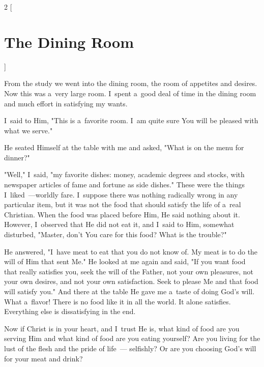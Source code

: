 \documentclass[a4paper,12pt]{article}
\begin{document}
\begin{multicols}{2}
    [
\section*{The Dining Room}
    ]

From the study we went into the dining room, the room of appetites and desires. Now this was a~very large room. I~spent a~good deal of time in the dining room and much effort in satisfying my wants. 

I~said to Him, "This is a~favorite room. I~am quite sure You will be pleased with what we serve." 

He seated Himself at the table with me and asked, "What is on the menu for dinner?" 

"Well," I~said, "my favorite dishes: money, academic degrees and stocks, with newspaper articles of fame and fortune as side dishes." These were the things I~liked~---worldly fare. I~suppose there was nothing radically wrong in any particular item, but it was not the food that should satisfy the life of a~real Christian. When the food was placed before Him, He said nothing about it. However, I~observed that He did not eat it, and I~said to Him, somewhat disturbed, "Master, don't You care for this food? What is the trouble?" 

He answered, "I~have meat to eat that you do not know of. My meat is to do the will of Him that sent Me." He looked at me again and said, "If you want food that really satisfies you, seek the will of the Father, not your own pleasures, not your own desires, and not your own satisfaction. Seek to please Me and that food will satisfy you." And there at the table He gave me a~taste of doing God's will. What a~flavor! There is no food like it in all the world. It alone satisfies. Everything else is dissatisfying in the end. 

Now if Christ is in your heart, and I~trust He is, what kind of food are you serving Him and what kind of food are you eating yourself? Are you living for the lust of the flesh and the pride of life~--- selfishly? Or are you choosing God's will for your meat and drink? 
\end{multicols}
\end{document}
